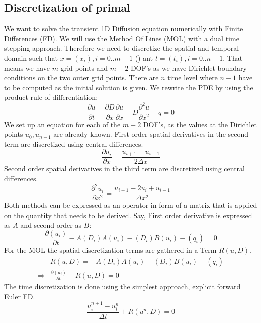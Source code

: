 \documentclass[10pt]{article}
\begin{document}
\subsection{Discretization of primal}
We want to solve the transient 1D Diffusion equation numerically with Finite Differences (FD). We will use the Method Of Lines (MOL) with a dual time stepping approach. Therefore we need to discretize the spatial and temporal domain such that $x=(x_i), i=0..m-1$ () ant $t=(t_i), i=0..n-1$. That means we have $m$ grid points and $m-2$ DOF's as we have Dirichlet boundary conditions on the two outer grid points. There are $n$ time level where $n-1$ have to be computed as the initial solution is given. We rewrite the PDE by using the product rule of differentiation:
\begin{equation}
\frac{\partial u}{\partial t} - \frac{\partial D}{\partial x}\frac{\partial u}{\partial x} -D \frac{\partial^2 u}{\partial x^2} - q = 0
\end{equation}
We set up an equation for each of the $m-2$ DOF's, as the values at the Dirichlet points $u_0, u_{n-1}$ are already known. First order spatial derivatives in the second term are discretized using central differences.
\begin{equation}
\frac{\partial u_i}{\partial x} = \frac{u_{i+1} - u_{i-1}}{2\Delta x}
\end{equation}
Second order spatial derivatives in the third term are discretized using central differences.
\begin{equation}
\frac{\partial^2 u_i}{\partial x^2} = \frac{u_{i+1} - 2 u_{i} + u_{i-1}}{\Delta x^2}
\end{equation}
Both methods can be expressed as an operator in form of a matrix that is applied on the quantity that needs to be derived. Say, First order derivative is expressed as $A$ and second order as $B$:
\begin{equation}
\frac{\partial (u_i)}{\partial t} - A(D_i)A(u_i) - (D_i) B(u_i) - (q_i) = 0
\end{equation}
For the MOL the spatial discretization terms are gathered in a Term $R(u,D)$.
\begin{align}
&R(u,D) = - A(D_i)A(u_i) - (D_i) B(u_i) - (q_i) \\
\Rightarrow & \frac{\partial (u_i)}{\partial t} + R(u,D) = 0
\end{align}
The time discretization is done using the simplest approach, explicit forward Euler FD.
\begin{equation}
\frac{u_i^{n+1} - u_i^n}{\Delta t} + R(u^n,D) = 0
\end{equation}
\end{document}
